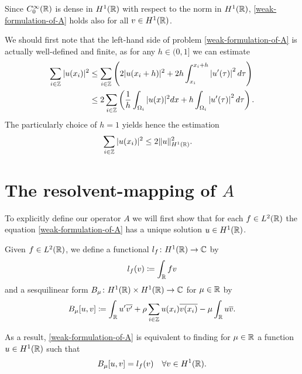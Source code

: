 \begin{remark}
	Since $C_{0}^{\infty}(\mathbb{R})$ is dense in $H^{1}(\mathbb{R})$ with respect to the norm in $H^{1}(\mathbb{R})$, \eqref{weak-formulation-of-A} holds also for all $v \in H^{1}(\mathbb{R})$. %
\end{remark}

We should first note that the left-hand side of problem \eqref{weak-formulation-of-A} is actually well-defined and finite, as for any $h \in (0, 1]$ we can estimate
\begin{align}
	\sum_{i \in \mathbb{Z}} |u(x_{i})|^{2} & \leq \sum_{i \in \mathbb{Z}} \left( 2 |u( x_{i} + h )|^{2} +  2 h \int_{x_{i}}^{x_{i} + h} \left| u'(\tau) \right|^{2} d\tau \right) \notag \\
		 & \leq 2 \sum_{i \in \mathbb{Z}} \left( \frac{1}{h} \int_{\Omega_{i}} |u( x )|^{2} dx + h \int_{\Omega_{i}} \left| u'(\tau) \right|^{2} d\tau \right). \label{preestimation-for-potential}
\end{align}
The particularly choice of $h = 1$ yields hence the estimation
\begin{align} 
		\sum_{i \in \mathbb{Z}} |u(x_{i})|^{2} & \leq 2 \| u \|^{2}_{H^{1}(\mathbb{R})}. \label{estimation-for-potential}
\end{align}

\section{The resolvent-mapping of $A$}

To explicitly define our operator $A$ we will first show that for each $f \in L^{2}(\mathbb{R})$ the equation \eqref{weak-formulation-of-A} has a unique solution $u \in H^{1}(\mathbb{R})$. 

\begin{definition}
	Given $f \in L^{2}(\mathbb{R})$, we define a functional $l_{f} \colon H^{1}(\mathbb{R}) \rightarrow \mathbb{C}$ by
	\[ l_{f}(v) \coloneqq \int_{\mathbb{R}} f v \]
and a sesquilinear form $B_{\mu} \colon H^{1}(\mathbb{R}) \times H^{1}(\mathbb{R}) \rightarrow \mathbb{C}$ for $\mu \in \mathbb{R}$ by
	\[ B_{\mu}[u, v] \coloneqq \int_{\mathbb{R}} u' \overline{v'} + \rho \sum_{i \in \mathbb{Z}} u(x_{i}) \overline{v(x_{i})} - \mu \int_{\mathbb{R}} u \overline{v}. \]
\end{definition}

As a result, \eqref{weak-formulation-of-A} is equivalent to finding for $\mu \in \mathbb{R}$ a function $u \in H^{1}(\mathbb{R})$ such that
	\begin{equation}
		B_{\mu}[u, v] =  l_{f}(v) \quad \forall v \in H^{1}(\mathbb{R}). \label{weak-formulation-of-A-for-LM}
	\end{equation}
	
